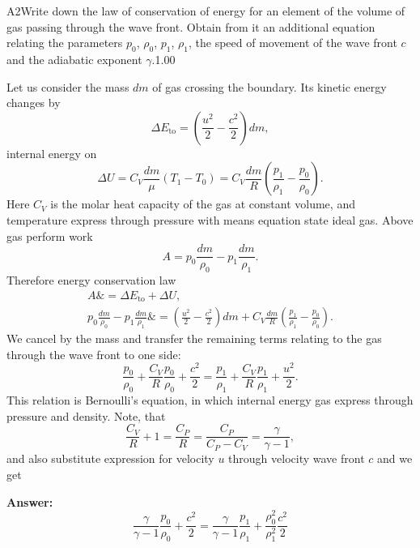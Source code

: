 \documentclass[11pt,a4paper]{article}
\begin{document}
\begin{solcard}{A2}{Write down the law of conservation of energy for an element of the volume of gas passing through the wave front. Obtain from it an additional equation relating the parameters $p_0$, $\rho_0$, $p_1$, $\rho_1$, the speed of movement of the wave front $c$ and the adiabatic exponent $\gamma$.}{1.00}

Let us consider the mass $dm$ of gas crossing the boundary. Its kinetic energy changes by $$ \Delta E_{\text{to}} = \left( \frac{u^2}{2}  -\frac{c^2}{2}\right) dm, $$internal energy on $$ \Delta U =  C_V \frac{dm}{\mu} (T_1 - T_0 )= C_V \frac{dm}{R} \left( \frac{p_1}{\rho_1} - \frac{p_0}{\rho_0}\right). $$Here $C_V$ is the molar heat capacity of the gas at constant volume, and temperature express through pressure with means equation state ideal gas. Above gas perform work $$ A =p_0 \frac{dm}{\rho_0} -p_1 \frac{dm}{\rho_1}. $$Therefore energy conservation law \begin{align*} A \&= \Delta E_{\text{to}} + \Delta U, \\ p_0 \frac{dm}{\rho_0} -p_1 \frac{dm}{\rho_1}\& = \left( \frac{u^2}{2}  -\frac{c^2}{2}\right) dm + C_V \frac{dm}{R} \left( \frac{p_1}{\rho_1} - \frac{p_0}{\rho_0}\right). \end{align*} We cancel by the mass and transfer the remaining terms relating to the gas through the wave front to one side: $$ \frac{p_0}{\rho_0} + \frac{C_V}{R} \frac{p_0}{\rho_0} + \frac{c^2}{2} = \frac{p_1}{\rho_1} + \frac{C_V}{R} \frac{p_1}{\rho_1} + \frac{u^2}{2}. $$This relation is Bernoulli's equation, in which internal energy gas express through pressure and density. Note, that $$ \frac{C_V}{R} + 1 = \frac{C_P}{R} = \frac{C_P}{C_P-C_V} = \frac{\gamma}{\gamma - 1}, $$and also substitute expression for velocity $u$ through velocity wave front $c$ and we get

\par\smallskip\noindent\textbf{Answer:} $$ \frac{\gamma}{\gamma - 1} \frac{p_0}{\rho_0} + \frac{c^2}{2} = \frac{\gamma}{\gamma - 1} \frac{p_1}{\rho_1} + \frac{\rho_0^2}{\rho_1^2}\frac{c^2}{2} $$
\end{solcard}
\end{document}
